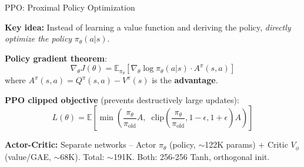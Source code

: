 \documentclass[aspectratio=169, 11pt]{beamer}
\begin{document}
\begin{frame}{PPO: Proximal Policy Optimization}

\textbf{Key idea:} Instead of learning a value function and deriving the policy, \textit{directly optimize the policy} $\pi_\theta(a|s)$.

\vspace{0.3em}
\textbf{Policy gradient theorem}:
\[
\nabla_\theta J(\theta) = \mathbb{E}_{\pi_\theta}\!\left[\nabla_\theta \log \pi_\theta(a|s) \cdot A^{\pi}(s,a)\right]
\]
where $A^{\pi}(s,a) = Q^{\pi}(s,a) - V^{\pi}(s)$ is the \textbf{advantage}.

\vspace{0.2em}
\textbf{PPO clipped objective} (prevents destructively large updates):
\[
L(\theta) = \mathbb{E}\!\left[\min\!\left(\frac{\pi_\theta}{\pi_{\text{old}}} A,\;\; \text{clip}\!\left(\frac{\pi_\theta}{\pi_{\text{old}}}, 1\!-\!\epsilon, 1\!+\!\epsilon\right) A \right)\right]
\]

\vspace{0.1em}
\textbf{Actor-Critic:} Separate networks -- Actor $\pi_\theta$ (policy, $\sim$122K params) + Critic $V_\phi$ (value/GAE, $\sim$68K). Total: $\sim$191K. Both: 256-256 Tanh, orthogonal init.
\end{frame}
\end{document}

